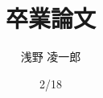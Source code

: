 \documentclass[a4paper, 11pt]{ltjsreport}
\theoremstyle{plain}
\theoremstyle{definition}
\begin{document}
\title{卒業論文}
\author{浅野  凌一郎}
\date{2/18}
\maketitle
\end{document}
